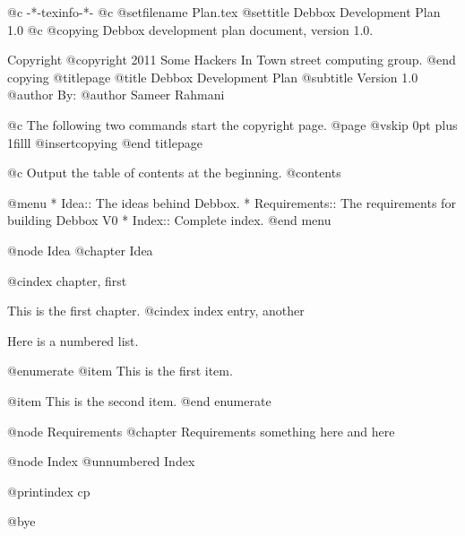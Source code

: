    @c -*-texinfo-*-
@c %
@setfilename Plan.tex
@settitle Debbox Development Plan 1.0
@c %
@copying
Debbox development plan document, version 1.0.

Copyright @copyright{} 2011 Some Hackers In Town street computing group.
@end copying
@titlepage
@title Debbox Development Plan
@subtitle Version 1.0
@author By:
@author Sameer Rahmani

@c The following two commands start the copyright page.
@page
@vskip 0pt plus 1filll
@insertcopying
@end titlepage

@c Output the table of contents at the beginning.
@contents

@menu
* Idea::    The ideas behind Debbox.
* Requirements::   The requirements for building Debbox V0
* Index::            Complete index.
@end menu

@node Idea
@chapter Idea

@cindex chapter, first

This is the first chapter.
@cindex index entry, another

Here is a numbered list.

@enumerate
@item
This is the first item.

@item
This is the second item.
@end enumerate

@node Requirements
@chapter Requirements
something here and here

@node Index
@unnumbered Index

@printindex cp

@bye
